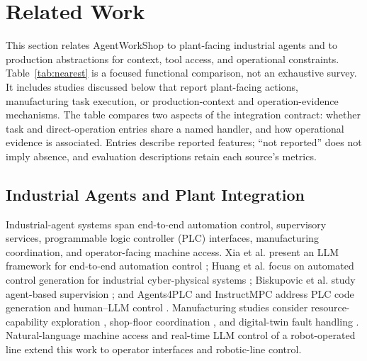 \section{Related Work}
\label{sec:related}
This section relates AgentWorkShop to plant-facing industrial agents and to
production abstractions for context, tool access, and operational constraints.
Table~\ref{tab:nearest} is a focused functional comparison, not an exhaustive
survey. It includes studies discussed below that report plant-facing actions,
manufacturing task execution, or production-context and operation-evidence
mechanisms. The table compares two aspects of the integration contract:
whether task and direct-operation entries share a named handler, and how
operational evidence is associated. Entries describe reported features;
``not reported'' does not imply absence, and evaluation descriptions retain
each source's metrics.

\subsection{Industrial Agents and Plant Integration}
Industrial-agent systems span end-to-end automation control, supervisory
services, programmable logic controller (PLC) interfaces, manufacturing
coordination, and operator-facing machine access. Xia et al. present an LLM framework for end-to-end automation
control \cite{xia2025control}; Huang et al. focus on automated control
generation for industrial cyber-physical systems \cite{huang2026made};
Biskupovic et al. study agent-based supervision
\cite{biskupovic2025supervision}; and Agents4PLC and InstructMPC address PLC
code generation and human--LLM control
\cite{liu2026agents4plc,wu2025instructmpc}. Manufacturing studies consider
resource-capability exploration \cite{lim2025llmenabled}, shop-floor
coordination \cite{zhao2026shopfloor}, and digital-twin fault handling
\cite{gill2025llmdt}. Natural-language machine access \cite{hofmann2025nlc}
and real-time LLM control of a robot-operated line
\cite{waseem2026pretrained} extend this work to operator interfaces and
robotic-line control.

